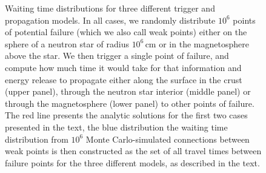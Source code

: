 \documentclass[12pt]{emulateapj}
\begin{document}
\begin{figure}
\centering
{}
                \vspace{-0.1cm}
        \vspace{-0.5cm}
         \vspace{0.5cm}
        \caption{Waiting time distributions for three different trigger and propagation models. In all cases, we randomly distribute $10^{6}$ points of potential failure (which we also call weak points) 
        either on the sphere of a neutron star of radius $10^{6}\,\mathrm{cm}$ or in the magnetosphere above the star. We then trigger a single point of failure, and compute how much time it would take for that 
        information and energy release to propagate either along the surface in the crust (upper panel), through the neutron star interior (middle panel) or through the magnetosphere (lower panel) to other points of failure. The red line presents the analytic solutions for the first two cases presented in the text, the blue distribution the waiting time distribution from $10^{6}$ Monte Carlo-simulated connections between weak points is then constructed as the set of all travel times between failure points for the three different models, as described in the text.}
                \label{fig:wtmodels}
\end{figure}
\end{document}
